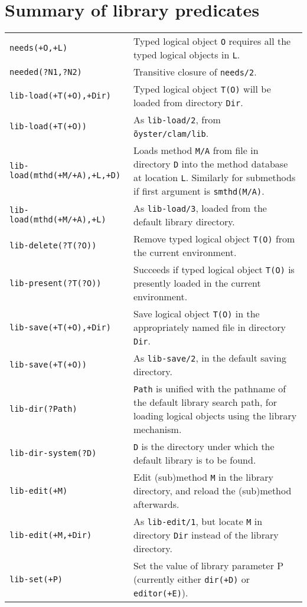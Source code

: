 \section {Summary of library predicates}
\label{library-preds}
{\small
\begin{supertabular}{@{}lp{.5\textwidth}@{}}
{\tt needs(+O,+L)} & Typed logical object {\tt O} requires all the
		typed logical objects in {\tt L}.\\
{\tt needed(?N1,?N2)} & Transitive closure of {\tt needs/2}.\\
{\tt lib-load(+T(+O),+Dir)} & Typed logical object {\tt T(O)} will be
		loaded from directory {\tt Dir}.\\
{\tt lib-load(+T(+O))} & As {\tt lib-load/2}, from 
		{\tt \~oyster/clam/lib}.\\
{\tt lib-load(mthd(+M/+A),+L,+D)} & Loads method {\tt M/A} from file in
		directory {\tt D} into the method database at location {\tt L}.
		Similarly for submethods if first argument is
		{\tt smthd(M/A)}.\\
{\tt lib-load(mthd(+M/+A),+L)} & As {\tt lib-load/3}, loaded from the
		default library directory.\\
{\tt lib-delete(?T(?O))} & Remove typed logical object {\tt T(O)} from the
		current environment.\\
{\tt lib-present(?T(?O))} & Succeeds if typed logical object {\tt T(O)}
		is presently loaded in the current environment.\\
{\tt lib-save(+T(+O),+Dir)} & Save logical object {\tt T(O)} in the
		appropriately named file in directory {\tt Dir}.\\
{\tt lib-save(+T(+O))} & As {\tt lib-save/2}, in the default saving
		directory.\\
{\tt lib-dir(?Path)} & {\tt Path} is unified with the pathname of the default
		library search path, for loading logical objects using the
		library mechanism. \\
{\tt lib-dir-system(?D)} & {\tt D} is the directory under which the
	default \clam{}  library is to be found. \\
{\tt lib-edit(+M)} & Edit (sub)method {\tt M} in the library directory,
		and reload the (sub)method afterwards. \\
{\tt lib-edit(+M,+Dir)} & As {\tt lib-edit/1}, but locate {\tt M} in
		directory {\tt Dir} instead of the library directory.\\
{\tt lib-set(+P)} & Set the value of library parameter P (currently either
		{\tt dir(+D)} or {\tt editor(+E)}).\\

\end{supertabular}}
